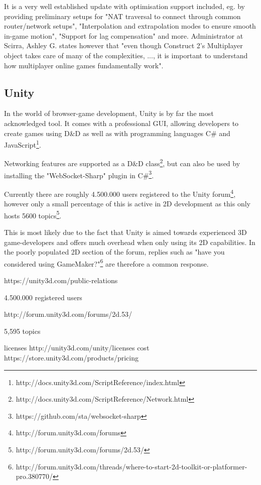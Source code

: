 \documentclass[bsc,frontabs,twoside,singlespacing,parskip,deptreport]{infthesis}     %
\begin{document}
It is a very well established update with optimisation support included, eg. by providing preliminary setups for "NAT traversal to connect through common router/network setups", "Interpolation and extrapolation modes to ensure smooth in-game motion", "Support for lag compensation" and more. Administrator at Scirra, Ashley G. states however that "even though Construct 2's Multiplayer object takes care of many of the complexities, ..., it is important to understand how multiplayer online games fundamentally work"\cite{Construct2_Multiplayer_Tutorial}.


\subsection{Unity}
In the world of browser-game development, Unity is by far the most acknowledged tool. It comes with a professional GUI, allowing developers to create games using D\&D as well as with programming languages C\# and JavaScript\footnote{http://docs.unity3d.com/ScriptReference/index.html}.

Networking features are supported as a D\&D class\footnote{http://docs.unity3d.com/ScriptReference/Network.html}, but can also be used by installing the "WebSocket-Sharp" plugin in C\#\footnote{https://github.com/sta/websocket-sharp}.

Currently there are roughly 4.500.000 users registered to the Unity forum\footnote{http://forum.unity3d.com/forums}, however only a small percentage of this is active in 2D development as this only hosts 5600 topics\footnote{http://forum.unity3d.com/forums/2d.53/}. 

This is most likely due to the fact that Unity is aimed towards experienced 3D game-developers and offers much overhead when only using its 2D capabilities. In the poorly populated 2D section of the forum, replies such as "have you considered using GameMaker?"\footnote{http://forum.unity3d.com/threads/where-to-start-2d-toolkit-or-platformer-pro.380770/} are therefore a common response.

https://unity3d.com/public-relations

4.500.000 registered users

http://forum.unity3d.com/forums/2d.53/

5,595 topics

licenses http://unity3d.com/unity/licenses
cost https://store.unity3d.com/products/pricing
\end{document}
